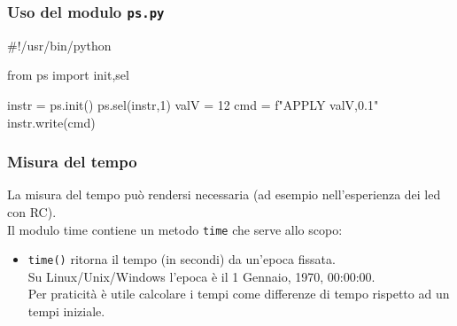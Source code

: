 \begin{frame}[fragile]
  \frametitle{Uso del modulo {\tt ps.py}}
\begin{python}
#!/usr/bin/python

from ps import init,sel

instr = ps.init()
ps.sel(instr,1)
valV = 12
cmd = f"APPLY {valV},0.1"
instr.write(cmd)

\end{python}
\end{frame}

\begin{frame}[fragile]
  \frametitle{Misura del tempo}
  La misura del tempo pu\`o rendersi necessaria (ad esempio nell'esperienza dei led con RC).\\
  Il modulo time contiene un metodo {\tt time} che serve allo scopo:
  \begin{itemize}
  \item {\tt time()} ritorna il tempo (in secondi) da un'epoca fissata.\\
    Su Linux/Unix/Windows l'epoca \`e il 1 Gennaio, 1970, 00:00:00.\\
    Per praticit\`a \`e utile calcolare i tempi come differenze di tempo rispetto ad un tempi iniziale.
  \end{itemize}
  
\end{frame}

